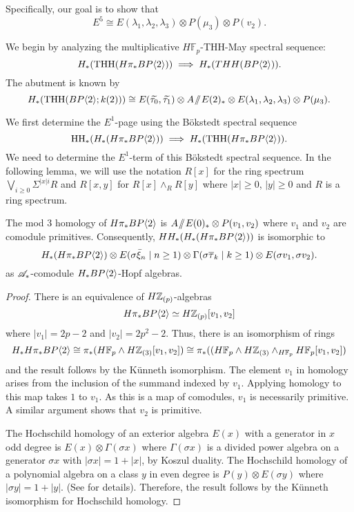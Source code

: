 Specifically, our goal is to show that 
\[
E^5 \cong E(\lambda_1, \lambda_2, \lambda_3)\otimes P(\mu_3)\otimes P(v_2).
\]

We begin by analyzing the multiplicative $H\mathbb{F}_p$-THH-May spectral sequence:
\begin{equation}\label{HTHHMay}
H_*(\operatorname{THH}(H\pi_*BP\langle 2 \rangle))\implies H_*(THH(BP\langle 2 \rangle)).
\end{equation}
The abutment is known by \cite{AngeltveitRognes} 
\[
H_*(\operatorname{THH}(BP\langle 2 \rangle;k(2)))\cong E(\widetilde{\tau_0}, \widetilde{\tau_1})\otimes A\! \sslash \! E(2)_*\otimes E(\lambda_1,\lambda_2, \lambda_3)\otimes P(\mu_3).
\]

We first determine the $E^1$-page using the B\"okstedt spectral sequence
\[
\operatorname{HH}_*(H_*(H\pi_*BP\langle 2 \rangle))\implies H_*( \operatorname{THH}(H\pi_*BP\langle 2 \rangle)).
\]
We need to determine the $E^1$-term of this B\"okstedt spectral sequence. In the following lemma, we will use the notation $R[x]$ for the ring spectrum $\bigvee_{i\ge 0} \Sigma^{|x|i}R$ and $R[x,y]$ for $R[x]\wedge_{R}R[y]$ where $|x|\ge0$, $|y|\ge0$ and $R$ is a ring spectrum. 
\begin{lem}
	The mod 3 homology of $H\pi_*BP\langle 2 \rangle$ is $A\! \sslash \! E(0)_*\otimes P(v_1, v_2)$ where $v_1$ and $v_2$ are comodule primitives. Consequently, 
	$HH_*(H_*(H\pi_*BP\langle 2 \rangle))$ is isomorphic to  
\[
H_*(H\pi_*BP\langle 2 \rangle)\otimes E(\sigma\bar{\xi}_n\mid n\geq 1)\otimes \Gamma(\sigma\overline{\tau}_k\mid k\geq 1)\otimes E(\sigma v_1, \sigma v_2).
\]
as $\mathscr{A}_*$-comodule $H_*BP\langle 2 \rangle$-Hopf algebras. 
\end{lem}
\begin{proof}
	There is an equivalence of $H\mathbb{Z}_{(p)}$-algebras
	\[
	H\pi_*BP\langle 2 \rangle\simeq  H\mathbb{Z}_{(p)}[v_1,v_2]
	\]
	where $|v_1|=2p-2$ and $|v_2|=2p^2-2$.
	Thus, there is an isomorphism of rings
	\[ H_*H\pi_*BP\langle 2 \rangle\cong \pi_*(H\mathbb{F}_p \wedge  H\mathbb{Z}_{(3)}[v_1,v_2])\cong  \pi_* ( (H\mathbb{F}_p\wedge H\mathbb{Z}_{(3)}\wedge_{H\mathbb{F}_p} H\mathbb{F}_p[v_1,v_2]) \]
	and the result follows by the K\"unneth isomorphism. 
	The element $v_1$ in homology arises from the inclusion of the summand indexed by $v_1$. Applying homology to this map takes $1$ to $v_1$. As this is a map of comodules, $v_1$ is necessarily primitive. A similar argument shows that $v_2$ is primitive.
	
The Hochschild homology of an exterior algebra $E(x)$ with a generator in $x$ odd degree is $E(x)\otimes \Gamma(\sigma x)$ where $\Gamma(\sigma x)$ is a divided power algebra on a generator $\sigma x$ with $|\sigma x|=1+|x|$, by Koszul duality. The Hochschild homology of a polynomial algebra on a class $y$ in even degree is $P(y)\otimes E(\sigma y)$ where $|\sigma y|=1+|y|$. (See \cite{McClureStaffeldt} for details). Therefore, the result follows by the K\"unneth isomorphism for Hochschild homology. 
\end{proof}

